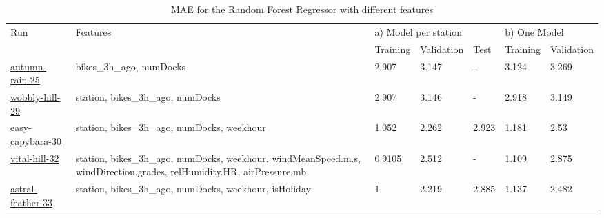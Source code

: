 \documentclass[a4paper]{article}
\begin{document}
    \begin{table}[h]
        \begin{tabularx}{\textwidth}{|X|p{}|XXX|XX|}
            \hline
            \multirow{2}{*}{Run} &
            \multirow{2}{*}{Features} &
            \multicolumn{3}{l|}{a) Model per station} &
            \multicolumn{2}{l|}{b) One Model} \\ \cline{3-7}
            &
            &
            \multicolumn{1}{l|}{Training} &
            \multicolumn{1}{l|}{Validation} &
            Test &
            \multicolumn{1}{l|}{Training} &
            Validation \\ \hline
            \href{https://wandb.ai/idegen/mlp-2021/runs/185f8iiz?workspace=user-idegen}{autumn-rain-25} &
            bikes\_3h\_ago, numDocks &
            \multicolumn{1}{l|}{2.907} &
            \multicolumn{1}{l|}{3.147} &
            - &
            \multicolumn{1}{l|}{3.124} &
            3.269 \\ \hline
            \href{https://wandb.ai/idegen/mlp-2021/runs/3ikbmzvm?workspace=user-idegen}{wobbly-hill-29} &
            station, bikes\_3h\_ago, numDocks &
            \multicolumn{1}{l|}{2.907} &
            \multicolumn{1}{l|}{3.146} &
            - &
            \multicolumn{1}{l|}{2.918} &
            3.149 \\ \hline
            \href{https://wandb.ai/idegen/mlp-2021/runs/36vs3wjd?workspace=user-idegen}{easy-capybara-30} &
            station, bikes\_3h\_ago, numDocks, weekhour &
            \multicolumn{1}{l|}{1.052} &
            \multicolumn{1}{l|}{2.262} &
            2.923 &
            \multicolumn{1}{l|}{1.181} &
            2.53 \\ \hline
            \href{https://wandb.ai/idegen/mlp-2021/runs/2ncnkrj2?workspace=user-idegen}{vital-hill-32} &
            station, bikes\_3h\_ago, numDocks, weekhour, windMeanSpeed.m.s, windDirection.grades, relHumidity.HR, airPressure.mb &
            \multicolumn{1}{l|}{0.9105} &
            \multicolumn{1}{l|}{2.512} &
            - &
            \multicolumn{1}{l|}{1.109} &
            2.875 \\ \hline
            \href{https://wandb.ai/idegen/mlp-2021/runs/140v0dji?workspace=user-idegen}{astral-feather-33} &
            station, bikes\_3h\_ago, numDocks, weekhour, isHoliday &
            \multicolumn{1}{l|}{1} &
            \multicolumn{1}{l|}{2.219} &
            2.885 &
            \multicolumn{1}{l|}{1.137} &
            2.482 \\ \hline
        \end{tabularx}
        \caption{MAE for the Random Forest Regressor with different features}
        \label{tbl:phase1-step3-runs-mae}
    \end{table}
\end{document}
